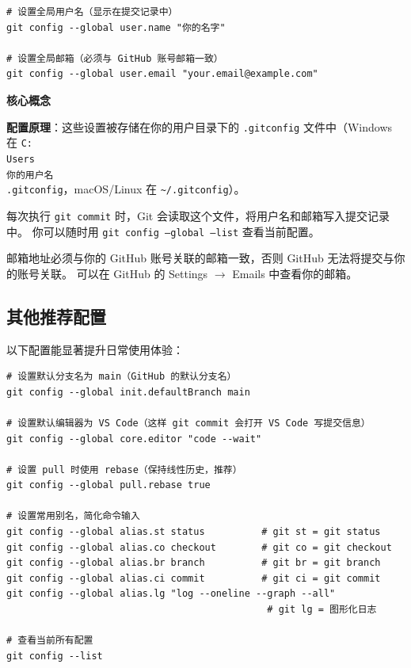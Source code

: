 \documentclass[12pt,a4paper,openany]{ctexbook}
\newenvironment{keybox}{%
  \medskip
  \noindent\textbf{\faKey\; 核心概念}
  \smallskip
}{%
  \medskip
}
\begin{document}
\begin{lstlisting}[style=shell]
# 设置全局用户名（显示在提交记录中）
git config --global user.name "你的名字"

# 设置全局邮箱（必须与 GitHub 账号邮箱一致）
git config --global user.email "your.email@example.com"
\end{lstlisting}

\begin{keybox}
\textbf{配置原理}：这些设置被存储在你的用户目录下的 \texttt{.gitconfig} 文件中（Windows 在 
\texttt{C:\\Users\\你的用户名\\.gitconfig}，macOS/Linux 在 \texttt{\textasciitilde/.gitconfig}）。

每次执行 \texttt{git commit} 时，Git 会读取这个文件，将用户名和邮箱写入提交记录中。
你可以随时用 \texttt{git config --global --list} 查看当前配置。
\end{keybox}

\begin{warnbox}
邮箱地址必须与你的 GitHub 账号关联的邮箱一致，否则 GitHub 无法将提交与你的账号关联。
可以在 GitHub 的 Settings $\to$ Emails 中查看你的邮箱。
\end{warnbox}

\subsection{其他推荐配置}

以下配置能显著提升日常使用体验：

\begin{lstlisting}[style=shell]
# 设置默认分支名为 main（GitHub 的默认分支名）
git config --global init.defaultBranch main

# 设置默认编辑器为 VS Code（这样 git commit 会打开 VS Code 写提交信息）
git config --global core.editor "code --wait"

# 设置 pull 时使用 rebase（保持线性历史，推荐）
git config --global pull.rebase true

# 设置常用别名，简化命令输入
git config --global alias.st status          # git st = git status
git config --global alias.co checkout        # git co = git checkout
git config --global alias.br branch          # git br = git branch
git config --global alias.ci commit          # git ci = git commit
git config --global alias.lg "log --oneline --graph --all"
                                              # git lg = 图形化日志

# 查看当前所有配置
git config --list
\end{lstlisting}
\end{document}

